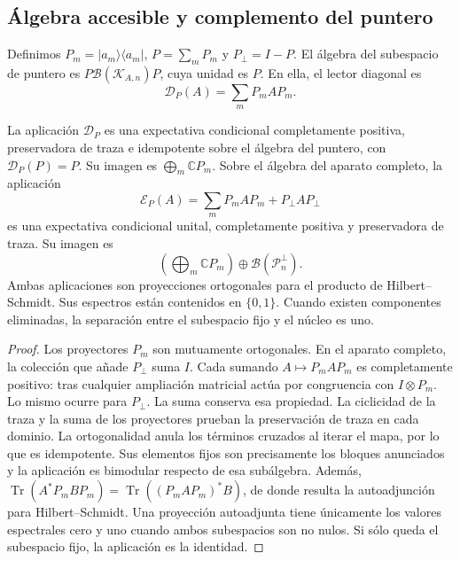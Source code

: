 \subsection{Álgebra accesible y complemento del puntero}
\label{vii:sec:observador-expectativa}

Definimos \(P_m=|a_m\rangle\langle a_m|\),
\(P=\sum_mP_m\) y \(P_\perp=I-P\). El álgebra del subespacio de
puntero es \(P\mathcal B(\mathcal K_{A,n})P\), cuya unidad es \(P\).
En ella, el lector diagonal es
\[
 \mathcal D_P(A)=\sum_mP_mAP_m.
\]

\begin{proposition}
\label{vii:prop:observador-pinzamiento}
La aplicación \(\mathcal D_P\) es una expectativa condicional
completamente positiva, preservadora de traza e idempotente sobre el
álgebra del puntero, con \(\mathcal D_P(P)=P\). Su imagen es
\(\bigoplus_m\mathbb CP_m\).
Sobre el álgebra del aparato completo, la aplicación
\begin{equation}
 \mathcal E_P(A)=\sum_mP_mAP_m+P_\perp AP_\perp
 \label{vii:eq:observador-complemento}
\end{equation}
es una expectativa condicional unital, completamente positiva y
preservadora de traza. Su imagen es
\[
 \left(\bigoplus_m\mathbb CP_m\right)
 \oplus\mathcal B(\mathcal P_n^\perp).
\]
Ambas aplicaciones son proyecciones ortogonales para el producto de
Hilbert--Schmidt. Sus espectros están contenidos en \(\{0,1\}\).
Cuando existen componentes eliminadas, la separación entre el
subespacio fijo y el núcleo es uno.
\end{proposition}

\begin{proof}
Los proyectores \(P_m\) son mutuamente ortogonales. En el aparato
completo, la colección que añade \(P_\perp\) suma \(I\). Cada sumando
\(A\mapsto P_mAP_m\) es completamente positivo: tras cualquier
ampliación matricial actúa por congruencia con \(I\otimes P_m\).
Lo mismo ocurre para \(P_\perp\). La suma conserva esa propiedad.
La ciclicidad de la traza y la suma de los proyectores prueban la
preservación de traza en cada dominio. La ortogonalidad anula los
términos cruzados al iterar el mapa, por lo que es idempotente.
Sus elementos fijos son precisamente los bloques anunciados y la
aplicación es bimodular respecto de esa subálgebra.
Además,
\(\operatorname{Tr}(A^*P_mBP_m)
 =\operatorname{Tr}((P_mAP_m)^*B)\),
de donde resulta la autoadjunción para Hilbert--Schmidt. Una proyección
autoadjunta tiene únicamente los valores espectrales cero y uno cuando
ambos subespacios son no nulos. Si sólo queda el subespacio fijo,
la aplicación es la identidad.
\end{proof}

